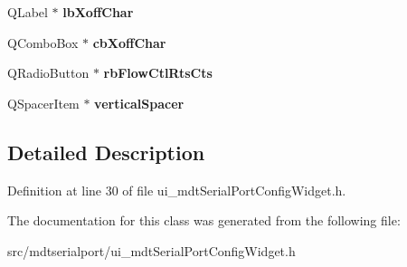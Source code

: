 \begin{DoxyCompactItemize}
\item 
\hypertarget{class_ui__mdt_serial_port_config_widget_a498de5e4f313a717ae2660cac026e61d}{
QLabel $\ast$ {\bfseries lbXoffChar}}
\label{class_ui__mdt_serial_port_config_widget_a498de5e4f313a717ae2660cac026e61d}

\item 
\hypertarget{class_ui__mdt_serial_port_config_widget_a1fa11aa8b0c9e4a7fcbe9f3506b6a62c}{
QComboBox $\ast$ {\bfseries cbXoffChar}}
\label{class_ui__mdt_serial_port_config_widget_a1fa11aa8b0c9e4a7fcbe9f3506b6a62c}

\item 
\hypertarget{class_ui__mdt_serial_port_config_widget_a51dd5f1afb25436fa0a7dc2c867fe316}{
QRadioButton $\ast$ {\bfseries rbFlowCtlRtsCts}}
\label{class_ui__mdt_serial_port_config_widget_a51dd5f1afb25436fa0a7dc2c867fe316}

\item 
\hypertarget{class_ui__mdt_serial_port_config_widget_a8f344fc14811cf144465a9185c865490}{
QSpacerItem $\ast$ {\bfseries verticalSpacer}}
\label{class_ui__mdt_serial_port_config_widget_a8f344fc14811cf144465a9185c865490}

\end{DoxyCompactItemize}


\subsection{Detailed Description}


Definition at line 30 of file ui\_\-mdtSerialPortConfigWidget.h.



The documentation for this class was generated from the following file:\begin{DoxyCompactItemize}
\item 
src/mdtserialport/ui\_\-mdtSerialPortConfigWidget.h\end{DoxyCompactItemize}
